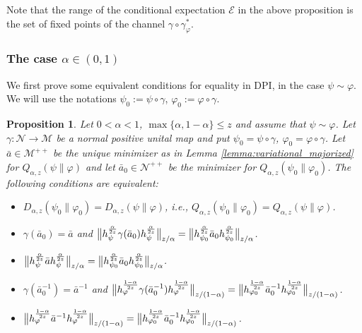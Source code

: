 \documentclass[12pt]{article}
\newtheorem{prop}[theorem]{Proposition}
\theoremstyle{definition}
\theoremstyle{remark}
\numberwithin{equation}{section}
\def\Me{\mathcal M}
\def\Ne{\mathcal N}
\def\ffi{\varphi}
\begin{document}
Note that the range of the conditional expectation $\mathcal E$ in the above proposition
is the set  of fixed points of the channel $\gamma\circ\gamma_\varphi^*$. 

\subsubsection{The case $\alpha\in (0,1)$}



We first prove some equivalent conditions for equality in DPI, in the case $\psi\sim
\ffi$. We will use the notations $\psi_0:=\psi\circ\gamma$, $\ffi_0:=\ffi\circ\gamma$.

\begin{prop}\label{prop:DPI_equality}
Let $0<\alpha<1$, $\max\{\alpha,1-\alpha\}\le z$ and assume that $\psi\sim \ffi$. Let
$\gamma:\Ne\to \Me$ be a normal positive unital map and put $\psi_0=\psi\circ\gamma$,
$\ffi_0=\ffi\circ\gamma$. Let 
$\bar a\in \Me^{++}$  
be the unique minimizer as in Lemma \ref{lemma:variational_majorized} for
$Q_{\alpha,z}(\psi\|\ffi)$ and let $\bar a_0\in \Ne^{++}$ be the minimizer for
$Q_{\alpha,z}(\psi_0\|\ffi_0)$. The following conditions are equivalent:
\begin{itemize}
\item[(i)] $D_{\alpha,z}(\psi_0\|\ffi_0)=D_{\alpha,z}(\psi\|\ffi)$, i.e.,
$Q_{\alpha,z}(\psi_0\|\ffi_0)=Q_{\alpha,z}(\psi\|\ffi)$.
\item[(ii)] $\gamma(\bar a_0)=\bar a$ and
$\big\|h_\psi^{\alpha\over2z}\gamma(\bar a_0)h_\psi^{\alpha\over2z}\big\|_{z/\alpha}
=\big\|h_{\psi_0}^{\alpha\over2z}\bar a_0h_{\psi_0}^{\alpha\over2z}\big\|_{z/\alpha}$.
\item[(iii)] $\big\|h_\psi^{\alpha\over2z}\bar ah_\psi^{\alpha\over2z}\big\|_{z/\alpha}
=\big\|h_{\psi_0}^{\alpha\over2z}\bar a_0h_{\psi_0}^{\alpha\over2z}\big\|_{z/\alpha}$.
\item[(iv)] $\gamma(\bar a_0^{-1})=\bar a^{-1}$ and
$\big\|h_\ffi^{1-\alpha\over2z}\gamma(\bar a_0^{-1})h_\ffi^{1-\alpha\over2z}\big\|_{z/(1-\alpha)}
=\big\|h_{\ffi_0}^{1-\alpha\over2z}\bar a_0^{-1}h_{\ffi_0}^{1-\alpha\over2z}\big\|_{z/(1-\alpha)}$.
\item[(v)] $\big\|h_\ffi^{1-\alpha\over2z}\bar a^{-1}h_\ffi^{1-\alpha\over2z}\big\|_{z/(1-\alpha)}
=\big\|h_{\ffi_0}^{1-\alpha\over2z}\bar a_0^{-1}h_{\ffi_0}^{1-\alpha\over2z}\big\|_{z/(1-\alpha)}$.
\end{itemize}
\end{prop}
\end{document}
